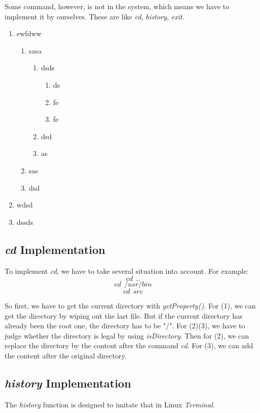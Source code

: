 \documentclass{article}
\begin{document}
Some command, however, is not in the system, which means we have to implement it by ourselves. These are like \emph{cd}, \emph{history}, \emph{exit}.
\begin{enumerate}
  \item ewfdww
  \begin{enumerate}
    \item sasa
    \begin{enumerate}
      \item dsds
      \begin{enumerate}
        \item ds
        \item fe
        \item fe
      \end{enumerate}
      \item dsd
      \item as
    \end{enumerate}
    \item sas
    \item dsd
  \end{enumerate}
  \item wdsd
  \item dssds
\end{enumerate}

\subsection{\emph{cd} Implementation}
To implement \emph{cd}, we have to take several situation into account. For example:
\begin{equation}
cd\ \ ..
\end{equation}
\begin{equation}
cd\ \ /usr/bin
\end{equation}
\begin{equation}
cd\ \ src
\end{equation}

So first, we have to get the current directory with \emph{getProperty()}. For (1), we can get the directory by wiping out the last file. But if the current directory has already been the root one, the directory has to be "/". For (2)(3), we have to judge whether the directory is legal by using \emph{isDirectory{}}. Then for (2), we can replace the directory by the content after the command \emph{cd}. For (3), we can add the content after the original directory.

\subsection{\emph{history} Implementation}
The \emph{history} function is designed to imitate that in Linux \emph{Terminal}.
\end{document}
